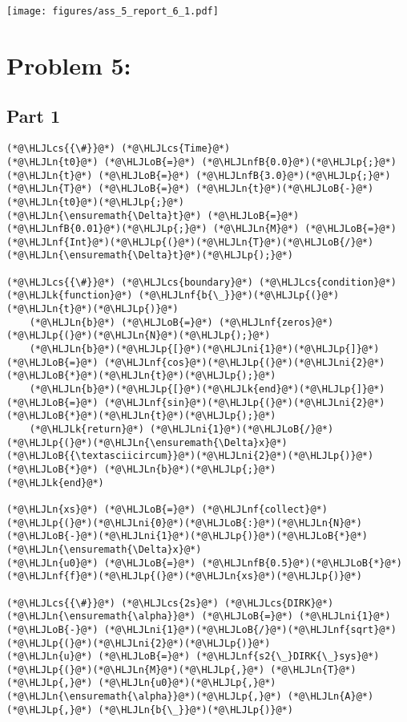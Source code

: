 \documentclass[12pt,a4paper]{article}
\newcommand{\HLJLk}[1]{\textcolor[RGB]{148,91,176}{\textbf{#1}}}
\newcommand{\HLJLn}[1]{#1}
\newcommand{\HLJLnf}[1]{\textcolor[RGB]{66,102,213}{#1}}
\newcommand{\HLJLnfB}[1]{\textcolor[RGB]{59,151,46}{#1}}
\newcommand{\HLJLni}[1]{\textcolor[RGB]{59,151,46}{#1}}
\newcommand{\HLJLoB}[1]{\textcolor[RGB]{102,102,102}{\textbf{#1}}}
\newcommand{\HLJLp}[1]{#1}
\newcommand{\HLJLcs}[1]{\textcolor[RGB]{153,153,119}{\textit{#1}}}
\begin{document}
\texttt{[image: figures/ass\_5\_report\_6\_1.pdf]}

\section{Problem 5:}
\subsection{Part 1}

\begin{lstlisting}
(*@\HLJLcs{{\#}}@*) (*@\HLJLcs{Time}@*)
(*@\HLJLn{t0}@*) (*@\HLJLoB{=}@*) (*@\HLJLnfB{0.0}@*)(*@\HLJLp{;}@*) (*@\HLJLn{t}@*) (*@\HLJLoB{=}@*) (*@\HLJLnfB{3.0}@*)(*@\HLJLp{;}@*) 
(*@\HLJLn{T}@*) (*@\HLJLoB{=}@*) (*@\HLJLn{t}@*)(*@\HLJLoB{-}@*)(*@\HLJLn{t0}@*)(*@\HLJLp{;}@*)
(*@\HLJLn{\ensuremath{\Delta}t}@*) (*@\HLJLoB{=}@*) (*@\HLJLnfB{0.01}@*)(*@\HLJLp{;}@*) (*@\HLJLn{M}@*) (*@\HLJLoB{=}@*) (*@\HLJLnf{Int}@*)(*@\HLJLp{(}@*)(*@\HLJLn{T}@*)(*@\HLJLoB{/}@*)(*@\HLJLn{\ensuremath{\Delta}t}@*)(*@\HLJLp{);}@*)

(*@\HLJLcs{{\#}}@*) (*@\HLJLcs{boundary}@*) (*@\HLJLcs{condition}@*)
(*@\HLJLk{function}@*) (*@\HLJLnf{b{\_}}@*)(*@\HLJLp{(}@*)(*@\HLJLn{t}@*)(*@\HLJLp{)}@*)
    (*@\HLJLn{b}@*) (*@\HLJLoB{=}@*) (*@\HLJLnf{zeros}@*)(*@\HLJLp{(}@*)(*@\HLJLn{N}@*)(*@\HLJLp{);}@*)
    (*@\HLJLn{b}@*)(*@\HLJLp{[}@*)(*@\HLJLni{1}@*)(*@\HLJLp{]}@*) (*@\HLJLoB{=}@*) (*@\HLJLnf{cos}@*)(*@\HLJLp{(}@*)(*@\HLJLni{2}@*)(*@\HLJLoB{*}@*)(*@\HLJLn{t}@*)(*@\HLJLp{);}@*)
    (*@\HLJLn{b}@*)(*@\HLJLp{[}@*)(*@\HLJLk{end}@*)(*@\HLJLp{]}@*) (*@\HLJLoB{=}@*) (*@\HLJLnf{sin}@*)(*@\HLJLp{(}@*)(*@\HLJLni{2}@*)(*@\HLJLoB{*}@*)(*@\HLJLn{t}@*)(*@\HLJLp{);}@*)
    (*@\HLJLk{return}@*) (*@\HLJLni{1}@*)(*@\HLJLoB{/}@*)(*@\HLJLp{(}@*)(*@\HLJLn{\ensuremath{\Delta}x}@*)(*@\HLJLoB{{\textasciicircum}}@*)(*@\HLJLni{2}@*)(*@\HLJLp{)}@*) (*@\HLJLoB{*}@*) (*@\HLJLn{b}@*)(*@\HLJLp{;}@*)
(*@\HLJLk{end}@*)

(*@\HLJLn{xs}@*) (*@\HLJLoB{=}@*) (*@\HLJLnf{collect}@*)(*@\HLJLp{(}@*)(*@\HLJLni{0}@*)(*@\HLJLoB{:}@*)(*@\HLJLn{N}@*)(*@\HLJLoB{-}@*)(*@\HLJLni{1}@*)(*@\HLJLp{)}@*)(*@\HLJLoB{*}@*)(*@\HLJLn{\ensuremath{\Delta}x}@*)
(*@\HLJLn{u0}@*) (*@\HLJLoB{=}@*) (*@\HLJLnfB{0.5}@*)(*@\HLJLoB{*}@*)(*@\HLJLnf{f}@*)(*@\HLJLp{(}@*)(*@\HLJLn{xs}@*)(*@\HLJLp{)}@*)

(*@\HLJLcs{{\#}}@*) (*@\HLJLcs{2s}@*) (*@\HLJLcs{DIRK}@*)
(*@\HLJLn{\ensuremath{\alpha}}@*) (*@\HLJLoB{=}@*) (*@\HLJLni{1}@*) (*@\HLJLoB{-}@*) (*@\HLJLni{1}@*)(*@\HLJLoB{/}@*)(*@\HLJLnf{sqrt}@*)(*@\HLJLp{(}@*)(*@\HLJLni{2}@*)(*@\HLJLp{)}@*)
(*@\HLJLn{u}@*) (*@\HLJLoB{=}@*) (*@\HLJLnf{s2{\_}DIRK{\_}sys}@*)(*@\HLJLp{(}@*)(*@\HLJLn{M}@*)(*@\HLJLp{,}@*) (*@\HLJLn{T}@*)(*@\HLJLp{,}@*) (*@\HLJLn{u0}@*)(*@\HLJLp{,}@*) (*@\HLJLn{\ensuremath{\alpha}}@*)(*@\HLJLp{,}@*) (*@\HLJLn{A}@*)(*@\HLJLp{,}@*) (*@\HLJLn{b{\_}}@*)(*@\HLJLp{)}@*)


\end{lstlisting}
\end{document}
